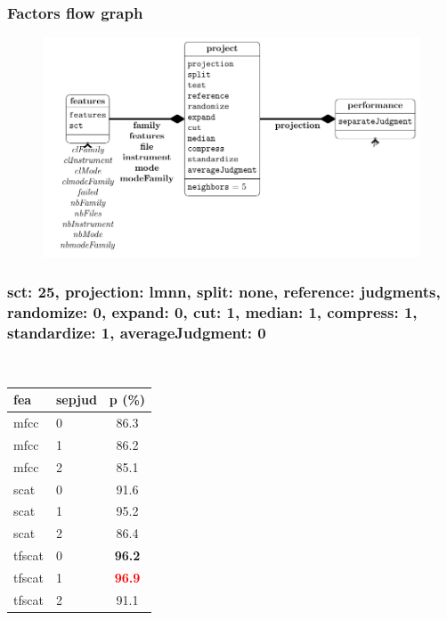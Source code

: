   
 
  
  
\begin{frame}\frametitle{Factors flow graph} 
  
  
\begin{center} 
  
  
\begin{figure} 
  
  
\includegraphics[width=\textwidth,height=0.8\textheight,keepaspectratio]{../figures/factors.pdf} 
  
  
\label{factorFlowGraph} 
  
  
\end{figure} 
  
  
\end{center} 
  
  
\end{frame} 
  
\begin{frame}\frametitle{sct: 25, projection: lmnn, split: none, reference: judgments, randomize: 0, expand: 0, cut: 1, median: 1, compress: 1, standardize: 1, averageJudgment: 0} 
  
\begin{table} 
\begin{center} 
\ 
 \setlength{\tabcolsep}{.16667em} 
\begin{tabular}{llc} 
fea & sepjud & p (\%) \\ 
\hline 
mfcc & 0 & 86.3 \\ 
mfcc & 1 & 86.2 \\ 
mfcc & 2 & 85.1 \\ 
scat & 0 & 91.6 \\ 
scat & 1 & 95.2 \\ 
scat & 2 & 86.4 \\ 
tfscat & 0 & \textbf{96.2} \\ 
tfscat & 1 & \textbf{\textcolor{red}{96.9}} \\ 
tfscat & 2 & 91.1 \\ 
\end{tabular} 
\end{center} 
\label{sc25PrlmSpnoRejuRa0Ex0Cu1Me1Co1St1Avju0} 
\end{table} 
 
\end{frame}  
